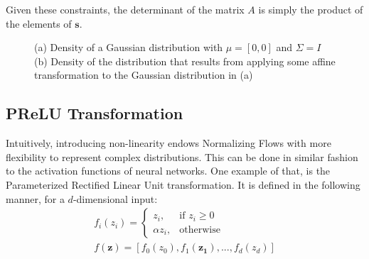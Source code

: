Given these constraints, the determinant of the matrix $A$ is simply the product
of the elements of $\mathbf{s}$.

\begin{figure}[!htb]
  \begin{subfigmatrix}{2}
  \end{subfigmatrix}
    \caption{(a) Density of a Gaussian distribution with $\mu = [0, 0]$ and $\Sigma = I$
    (b) Density of the distribution that results from applying some affine transformation to
    the Gaussian distribution in (a)
    }
  \label{fig:affine}
\end{figure}

\subsection{PReLU Transformation}
Intuitively, introducing non-linearity endows Normalizing Flows with more flexibility to 
represent complex distributions. This can be done in similar fashion to the
activation functions of neural networks. One example of that, is the Parameterized
Rectified Linear Unit transformation. It is defined in the following manner, for
a $d$-dimensional input:
\begin{align}
f_i(z_i) =
    \begin{cases}
        z_i,              & \text{if } z_i\geq 0\\
        \alpha z_i,       & \text{otherwise}
    \end{cases} \\
f(\mathbf{z}) = [f_0(z_0), f_1(\mathbf{z_1}), ..., f_d(z_d)]
\end{align}

